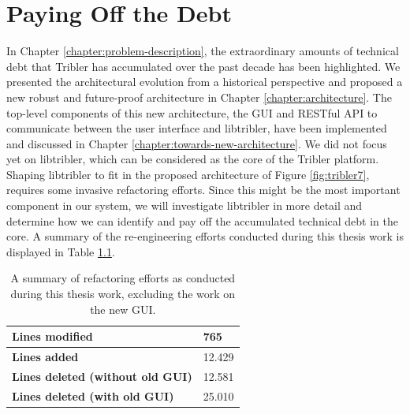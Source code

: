 \chapter{Paying Off the Debt}
\label{chapter:refactoring}
In Chapter \ref{chapter:problem-description}, the extraordinary amounts of technical debt that Tribler has accumulated over the past decade has been highlighted. We presented the architectural evolution from a historical perspective and proposed a new robust and future-proof architecture in Chapter \ref{chapter:architecture}. The top-level components of this new architecture, the GUI and RESTful API to communicate between the user interface and libtribler, have been implemented and discussed in Chapter \ref{chapter:towards-new-architecture}. We did not focus yet on libtribler, which can be considered as the core of the Tribler platform. Shaping libtribler to fit in the proposed architecture of Figure \ref{fig:tribler7}, requires some invasive refactoring efforts. Since this might be the most important component in our system, we will investigate libtribler in more detail and determine how we can identify and pay off the accumulated technical debt in the core. A summary of the re-engineering efforts conducted during this thesis work is displayed in Table \ref{table:refactoring-summary}.\\

\begin{table}[h!]
	\centering
	\begin{tabular}{|l|l|}
		\hline
		\textbf{Lines modified} & 765 \\ \hline
		\textbf{Lines added} & 12.429 \\ \hline
		\textbf{Lines deleted (without old GUI)} & 12.581 \\ \hline
		\textbf{Lines deleted (with old GUI)} & 25.010 \\ \hline
	\end{tabular}
	\caption{A summary of refactoring efforts as conducted during this thesis work, excluding the work on the new GUI.}
	\label{table:refactoring-summary}
\end{table}

